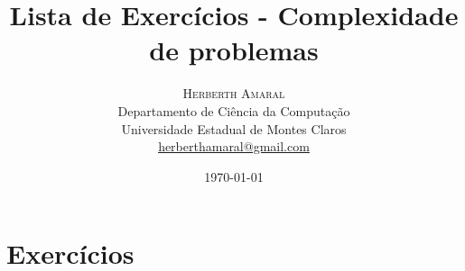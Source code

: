 \documentclass[11pt]{article}
\title{\vspace{.5cm}\fontsize{24pt}{10pt}\selectfont\textbf{\sc Lista de Exercícios - Complexidade de problemas}} %
\author{
\large
\textsc{Herberth Amaral}\\[2mm] %
\normalsize Departamento de Ciência da Computação \\
\normalsize Universidade Estadual de Montes Claros \\
\normalsize \href{mailto:herberthamaral@gmail.com}{herberthamaral@gmail.com} %
\vspace{-5mm}
}
\date{\today}
\begin{document}
\maketitle %

\thispagestyle{fancy} %

%
%

\newpage

\section*{Exercícios}
\end{document}
